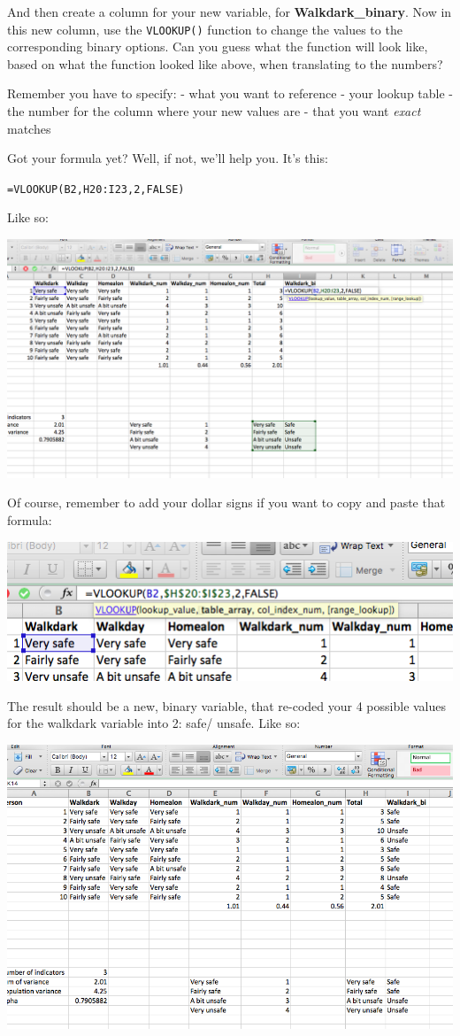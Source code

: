 \documentclass[
]{book}
\begin{document}
And then create a column for your new variable, for \textbf{Walkdark\_binary}. Now in this new column, use the \texttt{VLOOKUP()} function to change the values to the corresponding binary options. Can you guess what the function will look like, based on what the function looked like above, when translating to the numbers?

Remember you have to specify:
- what you want to reference
- your lookup table
- the number for the column where your new values are
- that you want \emph{exact} matches

Got your formula yet? Well, if not, we'll help you. It's this:

\texttt{=VLOOKUP(B2,H20:I23,2,FALSE)}

Like so:

\includegraphics{imgs/binary_vlookup.png}

Of course, remember to add your dollar signs if you want to copy and paste that formula:

\includegraphics{imgs/add_dolla_lookup.png}

The result should be a new, binary variable, that re-coded your 4 possible values for the walkdark variable into 2: safe/ unsafe. Like so:

\includegraphics{imgs/final_binary_recode.png}
\end{document}
